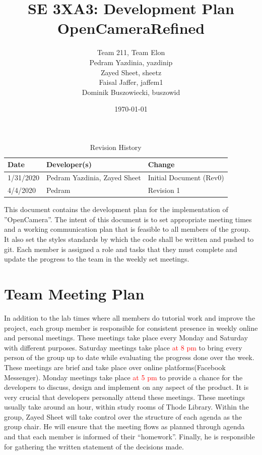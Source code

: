 \documentclass{article}
\title{SE 3XA3: Development Plan\\OpenCameraRefined}
\author{Team 211, Team Elon
		\\ Pedram Yazdinia, yazdinip
		\\ Zayed Sheet, sheetz
		\\ Faisal Jaffer, jaffem1
		\\ Dominik Buszowiecki, buszowid 
}
\date{\today}
\begin{document}
\begin{table}[hp]
\caption{Revision History} \label{TblRevisionHistory}
\begin{tabularx}{\textwidth}{llX}
\toprule
\textbf{Date} & \textbf{Developer(s)} & \textbf{Change}\\
\midrule
1/31/2020 & Pedram Yazdinia, Zayed Sheet & Initial Document (Rev0)\\
4/4/2020 & Pedram & Revision 1\\
\bottomrule
\end{tabularx}
\end{table}

\newpage

\maketitle


This document contains the development plan for the implementation of ''OpenCamera”. The intent of this document is to set appropriate meeting times and a working communication plan that is feasible to all members of the group. It also set the styles standards by which the code shall be written and pushed to git. Each member is assigned a role and tasks that they must complete and update the progress to the team in the weekly set meetings.


\section{Team Meeting Plan}

In addition to the lab times where all members do tutorial work and improve the project, each group member is responsible for consistent presence in weekly online and personal meetings. These meetings take place every Monday and Saturday with different purposes. Saturday meetings take place \textcolor{red}{at 8 pm }to bring every person of the group up to date while evaluating the progress done over the week. These meetings are brief and take place over online platforms(Facebook Messenger). Monday meetings take place \textcolor{red}{at 5 pm } to provide a chance for the developers to discuss, design and implement on any aspect of the product. It is very crucial that developers personally attend these meetings. These meetings usually take around an hour, within study rooms of Thode Library. Within the group, Zayed Sheet will take control over the structure of each agenda as the group chair. He will ensure that the meeting flows as planned through agenda and that each member is informed of their “homework”. Finally, he is responsible for gathering the written statement of the decisions made. 
\end{document}

